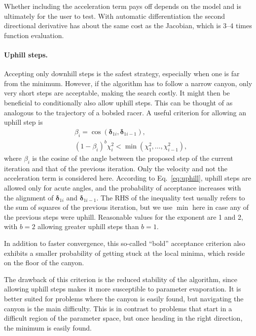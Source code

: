 \documentclass{article}
\begin{document}
Whether including the acceleration term pays off depends on the model
and is ultimately for the user to test. With automatic differentiation
the second directional derivative has about the same cost as the
Jacobian, which is 3--4 times function evaluation.

\paragraph{Uphill steps.} Accepting only downhill steps is the safest
strategy, especially when one is far from the minimum. However, if the
algorithm has to follow a narrow canyon, only very short steps are
acceptable, making the search costly. It might then be beneficial to
conditionally also allow uphill steps. This can be thought of as
analogous to the trajectory of a bobsled racer. A useful criterion for
allowing an uphill step is
\begin{equation}
  \label{eq:uphill}
  \begin{split}
    & \beta_i = \cos(\bm\delta_{1i},\bm\delta_{1i-1}), \\
    & (1-\beta_i)^b\chi_i^2 < \min(\chi_1^2,\ldots,\chi_{i-1}^2),
  \end{split}
\end{equation}
where $\beta_i$ is the cosine of the angle between the proposed step
of the current iteration and that of the previous iteration. Only the
velocity and not the acceleration term is considered here. According
to Eq.~\eqref{eq:uphill}, uphill steps are allowed only for acute
angles, and the probability of acceptance increases with the alignment
of $\bm\delta_{1i}$ and $\bm\delta_{1i-1}$. The RHS of the inequality
test usually refers to the sum of squares of the previous iteration,
but we use $\min$ here in case any of the previous steps were
uphill. Reasonable values for the exponent are 1 and 2, with $b=2$
allowing greater uphill steps than $b=1$.

In addition to faster convergence, this so-called ``bold'' acceptance
criterion also exhibits a smaller probability of getting stuck at the
local minima, which reside on the floor of the canyon.

The drawback of this criterion is the reduced stability of the
algorithm, since allowing uphill steps makes it more susceptible to
parameter evaporation. It is better suited for problems where the
canyon is easily found, but navigating the canyon is the main
difficulty. This is in contrast to problems that start in a difficult
region of the parameter space, but once heading in the right
direction, the minimum is easily found.
\end{document}
